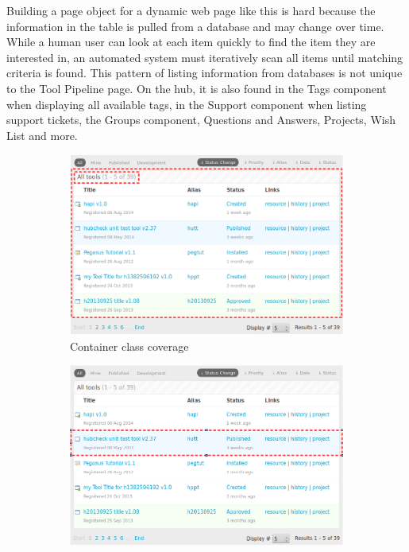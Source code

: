 Building a page object for a dynamic web page like this is hard because the
information in the table is pulled from a database and may change over time.
While a human user can look at each item quickly to find the item they are
interested in, an automated system must iteratively scan all items until
matching criteria is found. This pattern of listing information from databases
is not unique to the Tool Pipeline page. On the hub, it is also found in the
Tags component when displaying all available tags, in the Support component
when listing support tickets, the Groups component, Questions and Answers,
Projects, Wish List and more.

\begin{figure}[ht!]
        \centering
        \begin{subfigure}[b]{0.45\textwidth}
                \centering
                \includegraphics[width=\textwidth]{../../images/item_list_pattern_container.png}
                \caption{Container class coverage}
                \label{fig:itemlist_container_item_imgs_container}
        \end{subfigure}
        \begin{subfigure}[b]{0.45\textwidth}
                \centering
                \includegraphics[width=\textwidth]{../../images/item_list_pattern_item.png}

\end{subfigure}
\end{figure}
